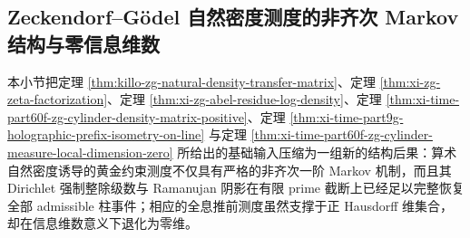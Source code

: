 \subsection{Zeckendorf--Gödel 自然密度测度的非齐次 Markov 结构与零信息维数}\label{subsec:conclusion-zg-density-inhomogeneous-markov-information-dimension}
本小节把定理 \ref{thm:killo-zg-natural-density-transfer-matrix}、定理 \ref{thm:xi-zg-zeta-factorization}、定理 \ref{thm:xi-zg-abel-residue-log-density}、定理 \ref{thm:xi-time-part60f-zg-cylinder-density-matrix-positive}、定理 \ref{thm:xi-time-part9g-holographic-prefix-isometry-on-line} 与定理 \ref{thm:xi-time-part60f-zg-cylinder-measure-local-dimension-zero} 所给出的基础输入压缩为一组新的结构后果：算术自然密度诱导的黄金约束测度不仅具有严格的非齐次一阶 Markov 机制，而且其 Dirichlet 强制整除级数与 Ramanujan 阴影在有限 prime 截断上已经足以完整恢复全部 admissible 柱事件；相应的全息推前测度虽然支撑于正 Hausdorff 维集合，却在信息维数意义下退化为零维。

